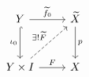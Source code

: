 \documentclass{article}
\begin{document}
    \begin{equation*}
        \begin{tikzcd}[row sep=0.4in]
            Y \ar[r, "\widetilde{f}_0"] \ar[d, "\iota_0"', hookrightarrow] & \widetilde{X} \ar[d, "p"] \\
            Y\times I \ar[r, "F"] \ar[ur, "\ex!\widetilde{F}", dashed] & X
        \end{tikzcd}
    \end{equation*}
\end{document}
